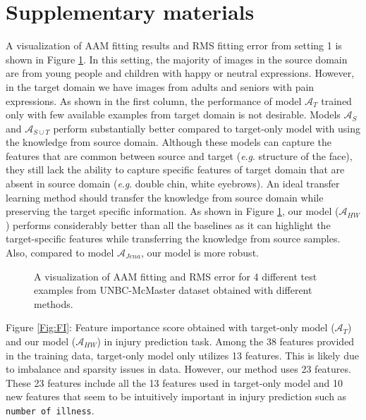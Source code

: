 \documentclass{article}
\newcommand{\eg}{\textit{e}.\textit{g}. }
\begin{document}
\newpage
\section{Supplementary materials}
\label{sec:supp}
A visualization of AAM fitting results and RMS fitting error from setting 1 is shown in Figure \ref{fig:aam}. In this setting, the majority of images in the source domain are from young people
and children with happy or neutral expressions. However, in the target domain we have images from adults and seniors with pain expressions. As shown in the first column, the performance of model $\mathcal{A}_T$ trained only with few available examples from target domain is not desirable. Models $\mathcal{A}_S$ and $\mathcal{A}_{S\cup T}$ perform substantially better compared to target-only model with using the knowledge from source domain. Although these models can capture the features that are common between source and target (\eg structure of the face), they still lack the ability to capture specific features of target domain that are absent in source domain (\eg double chin, white eyebrows). An ideal transfer learning method should transfer the knowledge from source domain while preserving the target specific information. As shown in Figure \ref{fig:aam}, our model ($\mathcal{A}_{HW}$) performs considerably better than all the baselines as it can highlight the target-specific features while transferring the knowledge from source samples. Also, compared to model $\mathcal{A}_{Jena}$, our model is more robust. 
\begin{figure}[htbp]
\fboxsep=0mm
\fboxrule=2pt
\centering
{}
\caption{A visualization of AAM fitting and RMS error for 4 different test examples from UNBC-McMaster dataset obtained with different methods.}
\label{fig:aam}
\end{figure}

\newpage
Figure \ref{Fig:FI}: Feature importance score obtained with target-only model ($\mathcal{A}_T$) and our model ($\mathcal{A}_{HW}$) in injury prediction task. Among the 38 features provided in the training data, target-only model only utilizes 13 features. This is likely due to imbalance  and sparsity issues in data. However, our method uses 23 features. These 23 features include all the 13 features used in target-only model and 10 new features that seem to be intuitively important in injury prediction such as \texttt{number of illness}. 
\begin{figure*}[htbp]
\centering
{}
\hspace{.2cm}
\caption{Illustration of feature importance scores obtained with target-only model ($\mathcal{A}_T$) and our hybrid model ($\mathcal{A}_{HW}$). Feature names are masked for confidentiality reasons.}
\label{Fig:FI}
\end{figure*}
\end{document}

